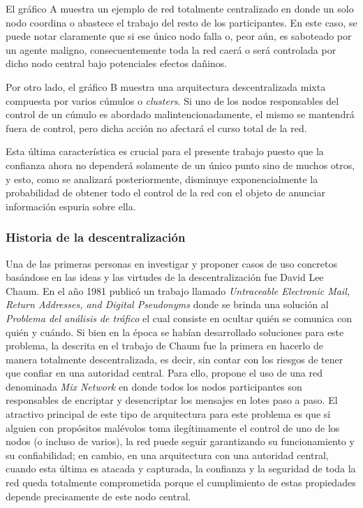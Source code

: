 El gráfico A muestra un ejemplo de red totalmente centralizado en donde un solo nodo coordina o abastece el trabajo del resto de los participantes. En este caso, se puede notar claramente que si ese único nodo falla o, peor aún, es saboteado por un agente maligno, consecuentemente toda la red caerá o será controlada por dicho nodo central bajo potenciales efectos dañinos.

Por otro lado, el gráfico B muestra una arquitectura descentralizada mixta compuesta por varios cúmulos o \textit{clusters}. Si uno de los nodos responsables del control de un cúmulo es abordado malintencionadamente, el mismo se mantendrá fuera de control, pero dicha acción no afectará el curso total de la red.

Esta última característica es crucial para el presente trabajo puesto que la confianza ahora no dependerá solamente de un único punto sino de muchos otros, y esto, como se analizará posteriormente, disminuye exponencialmente la probabilidad de obtener todo el control de la red con el objeto de anunciar información espuria sobre ella.

\subsubsection{Historia de la descentralización}
\label{historia_descentralizacion}

Una de las primeras personas en investigar y proponer casos de uso concretos basándose en las ideas y las virtudes de la descentralización fue David Lee Chaum. En el año 1981 publicó un trabajo llamado \textit{Untraceable Electronic Mail, Return Addresses, and Digital Pseudonyms}\cite{Chaum1981} donde se brinda una solución al \textit{Problema del análisis de tráfico} el cual consiste en ocultar quién se comunica con quién y cuándo. Si bien en la época se habían desarrollado soluciones para este problema, la descrita en el trabajo de Chaum fue la primera en hacerlo de manera totalmente descentralizada, es decir, sin contar con los riesgos de tener que confiar en una autoridad central. Para ello, propone el uso de una red denominada \textit{Mix Network} en donde todos los nodos participantes son responsables de encriptar y desencriptar los mensajes en lotes paso a paso. El atractivo principal de este tipo de arquitectura para este problema es que si alguien con propósitos malévolos toma ilegítimamente el control de uno de los nodos (o incluso de varios), la red puede seguir garantizando su funcionamiento y su confiabilidad; en cambio, en una arquitectura con una autoridad central, cuando esta última es atacada y capturada, la confianza y la seguridad de toda la red queda totalmente comprometida porque el cumplimiento de estas propiedades depende precisamente de este nodo central.

